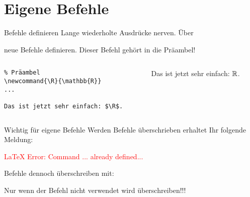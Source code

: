 \section{Eigene Befehle}

\begin{frame}[fragile]{Befehle definieren}
Lange wiederholte Ausdrücke nerven. Über

\begin{center}
\end{center}
neue Befehle definieren. Dieser Befehl gehört in die Präambel! 
\begin{columns}
\begin{column}{0.55\textwidth}
\begin{codeblock}
\begin{small}
\begin{verbatim}
% Präambel 
\newcommand{\R}{\mathbb{R}}
...

Das ist jetzt sehr einfach: $\R$.

\end{verbatim}
\end{small}
\end{codeblock}
\end{column}
\begin{column}{0.35\textwidth}
Das ist jetzt sehr einfach: $\R$.
\end{column}
\end{columns}
\end{frame}

\begin{frame}[fragile]{Wichtig für eigene Befehle}
Werden Befehle überschrieben erhaltet Ihr folgende Meldung: 
\begin{center}
\textcolor{red}{\LaTeX{} Error: Command ... already defined...}
\end{center}\pause
Befehle dennoch überschreiben mit:
\begin{center}
\end{center}
\alert{Nur wenn der Befehl nicht verwendet wird überschreiben!!!} 
\end{frame}